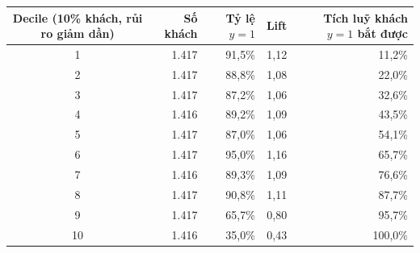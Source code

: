 \begin{tabular}{crrrr}
\toprule
Decile (10\% khách, rủi ro giảm dần) & Số khách & Tỷ lệ $y=1$ & Lift & Tích luỹ khách $y=1$ bắt được \\
\midrule
1 & 1.417 & 91,5\% & 1,12 & 11,2\% \\
2 & 1.417 & 88,8\% & 1,08 & 22,0\% \\
3 & 1.417 & 87,2\% & 1,06 & 32,6\% \\
4 & 1.416 & 89,2\% & 1,09 & 43,5\% \\
5 & 1.417 & 87,0\% & 1,06 & 54,1\% \\
6 & 1.417 & 95,0\% & 1,16 & 65,7\% \\
7 & 1.416 & 89,3\% & 1,09 & 76,6\% \\
8 & 1.417 & 90,8\% & 1,11 & 87,7\% \\
9 & 1.417 & 65,7\% & 0,80 & 95,7\% \\
10 & 1.416 & 35,0\% & 0,43 & 100,0\% \\
\bottomrule
\end{tabular}
